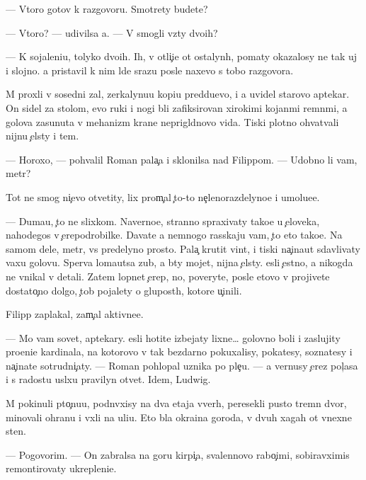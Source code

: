 \documentclass[10pt]{book}
\begin{document}
— Vtoro{\y} gotov k razgovoru. Smotrety budete?

— Vtoro{\y}? — udivilsa {\y}a. — V{\yi} smogli vz{\ia}ty dvo{\y}ih?

— K sojaleni{\y}u, tolyko dvo{\y}ih. Ih, v otli{\c}i{\y}e ot ostalyn{\yi}h, po{\y}maty okazalosy ne tak uj i slojno. {\Y}a pristavil k nim l{\iu}de{\y} srazu posle naxevo s tobo{\y} razgovora.

M{\yi} proxli v sosedni{\y} zal, zerkalynu{\y}u kopi{\y}u pred{\yi}du{\x}evo, i {\y}a uvidel starovo aptekar{\ia}. On sidel za stolom, {\y}evo ruki i nogi b{\yi}li zafiksirovan{\yi} xirokimi kojan{\yi}mi remn{\ia}mi, a golova zasunuta v mehanizm kra{\y}ne neprigl{\ia}dnovo vida. Tiski plotno ohvat{\yi}vali nijn{\iu}{\y}u {\c}el{\iu}sty i tem{\ia}.

— Horoxo, — pohvalil Roman pala{\c}a i sklonilsa nad Filippom. — Udobno li vam, metr?

Tot ne smog ni{\c}evo otvetity, lix prom{\yi}{\c}al {\c}to-to ne{\c}lenorazdelyno{\y}e i umol{\ia}{\y}u{\x}e{\y}e.

— Duma{\y}u, {\c}to ne slixkom. Naverno{\y}e, stranno spraxivaty tako{\y}e u {\c}eloveka, nahod{\ia}{\x}egos{\ia} v {\c}erepodrobilke. Dava{\y}te {\y}a nemnogo rasskaju vam, {\c}to eto tako{\y}e. Na samom dele, metr, vs{\e} predelyno prosto. Pala{\c} krutit vint, i tiski na{\c}ina{\y}ut sdavlivaty vaxu golovu. Sperva loma{\y}utsa zub{\yi}, a b{\yi}ty mojet, nijn{\ia}{\y}a {\c}el{\iu}sty. {\Y}esli {\c}estno, {\y}a nikogda ne vnikal v detali. Zatem lopnet {\c}erep, no, poveryte, posle etovo v{\yi} projivete dostato{\c}no dolgo, {\c}tob{\yi} pojalety o glupost{\ia}h, kotor{\yi}{\y}e u{\c}inili.

Filipp zaplakal, zam{\yi}{\c}al aktivne{\y}e.

— Mo{\y} vam sovet, aptekary. {\Y}esli hotite izbejaty lixne{\y}… golovno{\y} boli i zaslujity pro{\x}eni{\y}e kardinala, na kotorovo v{\yi} tak bezdarno pokuxalisy, poka{\y}tesy, sozna{\y}tesy i na{\c}ina{\y}te sotrudni{\c}aty. — Roman pohlopal uznika po ple{\c}u. — {\Y}a vernusy {\c}erez pol{\c}asa i s radost{\y}u usl{\yi}xu pravilyn{\yi}{\y} otvet. Idem, Ludwig.

M{\yi} pokinuli p{\yi}to{\c}nu{\y}u, podn{\ia}vxisy na dva etaja vverh, peresekli pusto{\y} t{\iu}remn{\yi}{\y} dvor, minovali ohranu i v{\yi}xli na uli{\q}u. Eto b{\yi}la okra{\y}ina goroda, v dvuh xagah ot vnexne{\y} sten{\yi}.

— Pogovorim. — On zabralsa na goru kirpi{\c}a, svalennovo rabo{\c}imi, sobiravximis{\ia} remontirovaty ukrepleni{\y}e.
\end{document}
